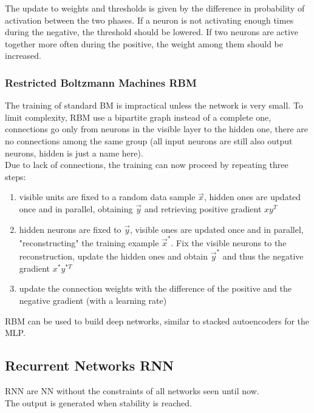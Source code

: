 The update to weights and thresholds is given by the difference in probability of activation between the two phases. If a neuron is not activating enough times during the negative, the threshold should be lowered. If two neurons are active together more often during the positive, the weight among them should be increased.\\

\subsubsection{Restricted Boltzmann Machines RBM}
The training of standard BM is impractical unless the network is very small. To limit complexity, RBM use a bipartite graph instead of a complete one, connections go only from neurons in the visible layer to the hidden one, there are no connections among the same group (all input neurons are still also output neurons, hidden is just a name here).\\

Due to lack of connections, the training can now proceed by repeating three steps: 
\begin{enumerate}
	\item visible units are fixed to a random data sample $\vec{x}$, hidden ones are updated once and in parallel, obtaining $\vec{y}$ and retrieving positive gradient $xy^T$
	\item hidden neurons are fixed to $\vec{y}$, visible ones are updated once and in parallel, "reconstructing" the training example $\vec{x}^\ast$. Fix the visible neurons to the reconstruction, update the hidden ones and obtain $\vec{y}^\ast$ and thus the negative gradient $x^\ast y^{\ast T}$
	\item update the connection weights with the difference of the positive and the negative gradient (with a learning rate)
\end{enumerate}

RBM can be used to build deep networks, similar to stacked autoencoders for the MLP.\\

\subsection{Recurrent Networks RNN}
RNN are NN without the constraints of all networks seen until now.\\
The output is generated when stability is reached.\\

